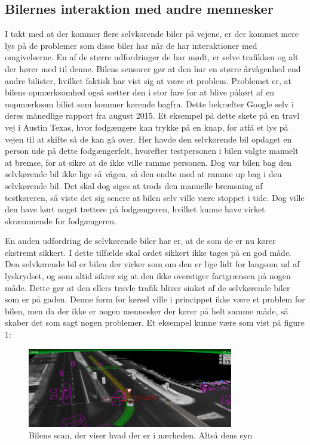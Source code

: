 \subsection{Bilernes interaktion med andre mennesker}
I takt med at der kommer flere  selvkørende biler på vejene, er der kommet mere lys på de problemer som disse biler har når de har interaktioner med omgivelserne. En af de større udfordringer de har mødt, er selve trafikken og alt der hører med til denne. Bilens sensorer gør at den har en større årvågenhed end andre bilister, hvilket faktisk har vist sig at være et problem. Problemet er, at bilens opmærksomhed også sætter den i stor fare for at blive påkørt af en uopmærksom bilist som kommer kørende bagfra. Dette bekræfter Google selv i deres månedlige rapport fra august 2015\cite{GOOG_MONTHLY}. Et eksempel på dette skete på en travl vej i Austin Texas, hvor fodgængere kan trykke på en knap, for atfå et lys på vejen til at skifte så de kan gå over. Her havde den selvkørende bil opdaget en person ude på dette fodgængerfelt, hvorefter testpersonen i bilen valgte  manuelt at bremse, for at sikre at de ikke ville ramme personen. Dog var bilen bag den selvkørende bil ikke lige så vågen, så den endte med at ramme up bag i den selvkørende bil. Det skal dog siges at trods den manuelle bremsning af testkøreren, så viste det sig senere at bilen selv ville være stoppet i tide. Dog ville den have kørt noget tættere på fodgængeren, hvilket kunne have virket skræmmende for fodgængeren. 

En anden udfordring de selvkørende biler har er, at de som de er nu kører ekstremt sikkert. I dette tilfælde skal ordet sikkert ikke tages på en god måde. Den selvkørende bil er bilen der virker som om den er lige lidt for langsom ud af lyskrydset, og som altid sikrer sig at den ikke overstiger fartgrænsen på nogen måde. Dette gør at den ellers travle trafik bliver sinket af de selvkørende biler som er på gaden. Denne form for kørsel ville i princippet ikke være et problem for bilen, men da der ikke er nogen mennesker der kører på helt samme måde, så skaber det som sagt nogen problemer. Et eksempel kunne være som vist på figure 1:

\begin{figure}[h!]
    \centering
    \includegraphics[width=0.8\textwidth]{images/google_vision.png}
    \caption{Bilens scan, der viser hvad der er i nærheden. Altså dens syn}
    \label{fig:car_vision}
\end{figure}

